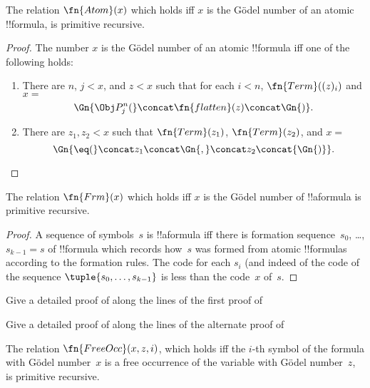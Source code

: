 \documentclass[../../../include/open-logic-section]{subfiles}
\begin{document}

\begin{prop}
The relation $\fn{Atom}(x)$ which holds iff $x$ is the G\"odel number
of an atomic !!{formula}, is primitive recursive.
\end{prop}

\begin{proof}
The number $x$ is the G\"odel number of an atomic !!{formula} iff
one of the following holds:
\begin{enumerate}
\item There are $n$, $j < x$, and $z < x$ such that for each $i < n$,
  $\fn{Term}((z)_i)$ and $x = $
\[
\Gn{\Obj P^n_j(} \concat \fn{flatten}(z) \concat \Gn{)}.
\]
\item There are $z_1, z_2 < x$ such that $\fn{Term}(z_1)$,
  $\fn{Term}(z_2)$, and $x = $
\[
\Gn{{\eq}(} \concat z_1 \concat \Gn{,} \concat z_2 \concat{\Gn{)}}.
\]
\end{enumerate}
\end{proof}

\begin{prop}
The relation $\fn{Frm}(x)$ which holds iff $x$ is the G\"odel number
of !!a{formula} is primitive recursive.
\end{prop}

\begin{proof}
A sequence of symbols~$s$ is !!a{formula} iff there is formation
sequence~$s_0$, \dots, $s_{k-1} = s$ of !!{formula} which records
how~$s$ was formed from atomic !!{formula}s according to the
formation rules.  The code for each $s_i$ (and indeed of the code of
the sequence $\tuple{s_0, \dots, s_{k-1}}$ is less than the code~$x$
of~$s$.
\end{proof}

\begin{prob}
Give a detailed proof of  along
the lines of the first proof of
\end{prob}

\begin{prob}
Give a detailed proof of  along
the lines of the alternate proof of
\end{prob}

\begin{prop}
The relation $\fn{FreeOcc}(x, z, i)$, which holds iff the $i$-th
symbol of the formula with G\"odel number~$x$ is a free occurrence of
the variable with G\"odel number~$z$, is primitive recursive.
\end{prop}
\end{document}
